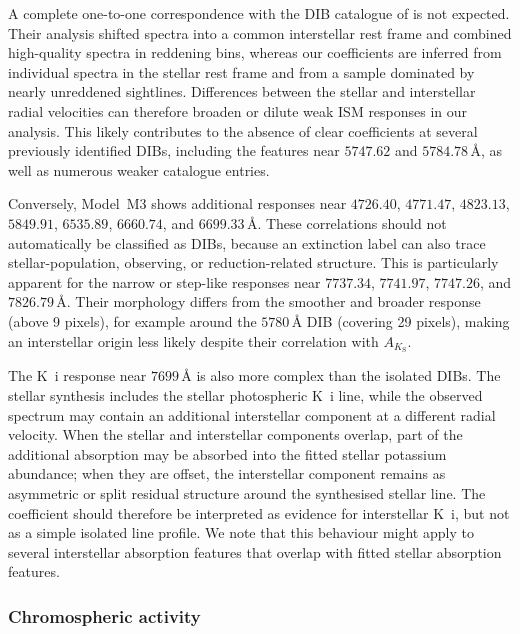 \documentclass[twocolumn,apj,numberedappendix,appendixfloats]{openjournal}
\begin{document}
A complete one-to-one correspondence with the DIB catalogue of \citet{Vogrincic2023} is not expected. Their analysis shifted spectra into a common interstellar rest frame and combined high-quality spectra in reddening bins, whereas our coefficients are inferred from individual spectra in the stellar rest frame and from a sample dominated by nearly unreddened sightlines. Differences between the stellar and interstellar radial velocities can therefore broaden or dilute weak ISM responses in our analysis. This likely contributes to the absence of clear coefficients at several previously identified DIBs, including the features near $5747.62$ and $5784.78\,\text{\AA}$, as well as numerous weaker catalogue entries.

Conversely, Model~\textcolor{M3}{M3} shows additional responses near $4726.40$, $4771.47$, $4823.13$, $5849.91$, $6535.89$, $6660.74$, and $6699.33\,\text{\AA}$. These correlations should not automatically be classified as DIBs, because an extinction label can also trace stellar-population, observing, or reduction-related structure. This is particularly apparent for the narrow or step-like responses near $7737.34$, $7741.97$, $7747.26$, and $7826.79\,\text{\AA}$. Their morphology differs from the smoother and broader response (above 9 pixels), for example around the $5780\,\text{\AA}$ DIB (covering 29 pixels), making an interstellar origin less likely despite their correlation with $A_{K_\mathrm{S}}$.

The K~{\sc i} response near $7699\,\text{\AA}$ is also more complex than the isolated DIBs. The stellar synthesis includes the stellar photospheric K~{\sc i} line, while the observed spectrum may contain an additional interstellar component at a different radial velocity. When the stellar and interstellar components overlap, part of the additional absorption may be absorbed into the fitted stellar potassium abundance; when they are offset, the interstellar component remains as asymmetric or split residual structure around the synthesised stellar line. The coefficient should therefore be interpreted as evidence for interstellar K~{\sc i}, but not as a simple isolated line profile. We note that this behaviour might apply to several interstellar absorption features that overlap with fitted stellar absorption features.

\subsubsection{Chromospheric activity}
\label{sec:analysis_cannon_activity_labels}
\end{document}
